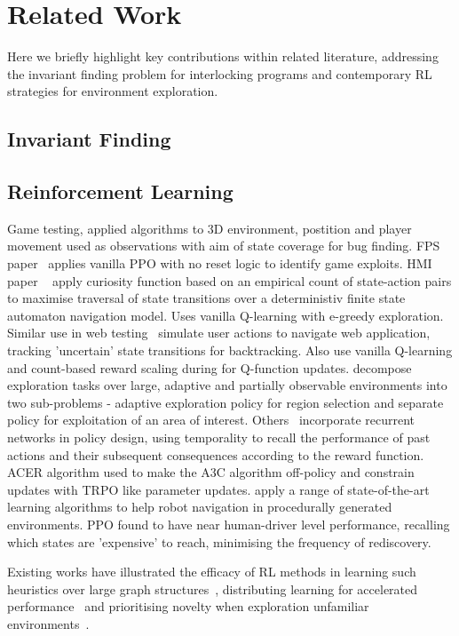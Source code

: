 \documentclass[conference,compsoc]{IEEEtran}
\begin{document}
\section{Related Work}
Here we briefly highlight key contributions within related literature, addressing the invariant finding problem for interlocking programs and contemporary RL strategies for environment exploration.

\subsection{Invariant Finding}

\subsection{Reinforcement Learning}
Game testing, applied algorithms to 3D environment, postition and player movement used as observations with aim of state coverage for bug finding. FPS paper~\cite{9231552} applies vanilla PPO with no reset logic to identify game exploits. HMI paper ~\cite{9678703} apply curiosity function based on an empirical count of state-action pairs to maximise traversal of state transitions over a deterministiv finite state automaton navigation model. Uses vanilla Q-learning with e-greedy exploration. Similar use in web testing~\cite{9402046} simulate user actions to navigate web application, tracking 'uncertain' state transitions for backtracking. Also use vanilla Q-learning and count-based reward scaling during for Q-function updates. \cite{9476756} decompose exploration tasks over large, adaptive and partially observable environments into two sub-problems - adaptive exploration policy for region selection and separate policy for exploitation of an area of interest. Others~\cite{s21041067} incorporate recurrent networks in policy design, using temporality to recall the performance of past actions and their subsequent consequences according to the reward function. ACER algorithm used to make the A3C algorithm off-policy and constrain updates with TRPO like parameter updates. \cite{electronics10222751} apply a range of state-of-the-art learning algorithms to help robot navigation in procedurally generated environments. PPO found to have near human-driver level performance, recalling which states are 'expensive' to reach, minimising the frequency of rediscovery.

Existing works have illustrated the efficacy of RL methods in learning such heuristics over large graph structures~\cite{manchanda2019learning}, distributing learning for accelerated performance~\cite{hoffman2020acme} and prioritising novelty when exploration unfamiliar environments~\cite{ostrovski2017countbased, haarnoja2018soft, gordillo2021improving}.
\end{document}
